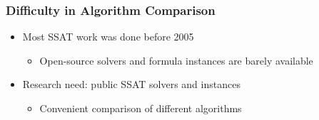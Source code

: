 \begin{frame}
      \frametitle{Difficulty in Algorithm Comparison}
      \begin{itemize}
            \item Most SSAT work was done before 2005~\cite{Majercik1998,Majercik2003,Majercik2004,Majercik2005}
                  \begin{itemize}
                        \item Open-source solvers and formula instances are barely available
                  \end{itemize}
                  \pause
            \item \alert{Research need: public SSAT solvers and instances}
                  \begin{itemize}
                        \item Convenient comparison of different algorithms
                  \end{itemize}
      \end{itemize}
\end{frame}